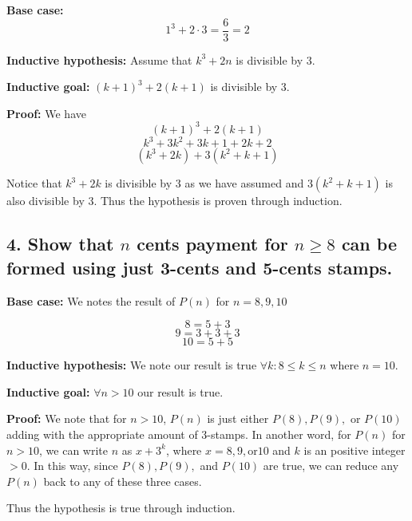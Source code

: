 \documentclass{article}
\begin{document}
\textbf{Base case:} 
$$1^3 + 2\cdot 3 = \frac{6}{3} = 2$$

\textbf{Inductive hypothesis:} Assume that 
$k^3 + 2n$ is divisible by $3$.

\textbf{Inductive goal:} $(k+1)^3 + 2(k+1)$ is divisible by $3$.

\textbf{Proof:}
We have 
$$(k+1)^3 + 2(k+1)$$
$$k^3 + 3k^2 + 3k + 1 + 2k + 2$$
$$(k^3 + 2k) + 3(k^2+k +1)$$

Notice that $k^3 + 2k$ is divisible by $3$ as we have assumed and $3(k^2+k +1)$ is also divisible by $3$. Thus the hypothesis is proven through induction.

\subsection*{4. Show that $n$ cents payment for $n \geq 8$ can be formed using just 3-cents and 5-cents stamps.}

\textbf{Base case:} We notes the result of $P(n)$ for $n = 8, 9, 10$

$$8= 5+3$$
$$9 = 3 + 3+ 3$$
$$10=5+5$$

\textbf{Inductive hypothesis:} We note our result is true $\forall k: 8\leq k\leq n$ where $n = 10$. 

\textbf{Inductive goal:} $\forall n >  10$ our result is true.

\textbf{Proof:}
We note that for $n>10$, $P(n)$ is just either $P(8), P(9),$ or $P(10)$ adding with the appropriate amount of 3-stamps. In another word, for $P(n)$ for $n>10$, we can write $n$ as $x + 3^k$, where $x = 8,9, $or$ 10$ and $k$ is an positive integer $>0$. In this way, since $P(8), P(9),$ and $P(10)$ are true, we can reduce any $P(n)$ back to any of these three cases.

Thus the hypothesis is true through induction.
\end{document}
